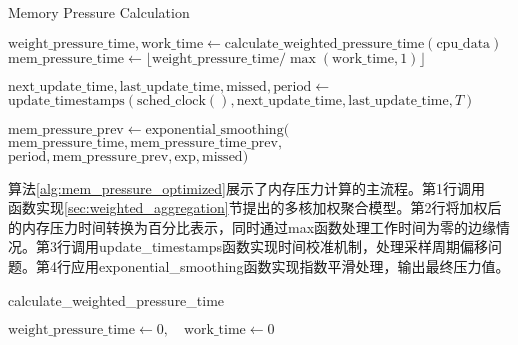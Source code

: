 \begin{algorithm}[htbp]
    \caption{Memory Pressure Calculation}
    \label{alg:mem_pressure_optimized}
    \SetAlgoLined
    \DontPrintSemicolon


    \BlankLine

    \(\text{weight\_pressure\_time}, \text{work\_time} \gets \text{calculate\_weighted\_pressure\_time}(\text{cpu\_data})\)\;
    \(\text{mem\_pressure\_time} \gets \lfloor \text{weight\_pressure\_time}/\max(\text{work\_time},1)\rfloor\)\;

    \(\text{next\_update\_time}, \text{last\_update\_time}, \text{missed}, \text{period} \gets\) \(\text{update\_timestamps}(\text{sched\_clock}(), \text{next\_update\_time}, \text{last\_update\_time}, T)\)\;

    \(\text{mem\_pressure\_prev} \gets \text{exponential\_smoothing}(\)
    \qquad \(\text{mem\_pressure\_time}, \text{mem\_pressure\_time\_prev},\)
    \qquad \(\text{period}, \text{mem\_pressure\_prev}, \text{exp}, \text{missed})\)\;
\end{algorithm}

算法\ref{alg:mem_pressure_optimized}展示了内存压力计算的主流程。第1行调用\\
函数实现\ref{sec:weighted_aggregation}节提出的多核加权聚合模型。第2行将加权后的内存压力时间转换为百分比表示，同时通过max函数处理工作时间为零的边缘情况。第3行调用update\_timestamps函数实现时间校准机制，处理采样周期偏移问题。第4行应用exponential\_smoothing函数实现指数平滑处理，输出最终压力值。

\begin{algorithm}[htbp]
\caption{calculate\_weighted\_pressure\_time}
\label{alg:calculate_weighted_pressure_time}
\SetAlgoLined
\DontPrintSemicolon
{}
\(\text{weight\_pressure\_time} \gets 0,\quad \text{work\_time} \gets 0\)\;
\end{algorithm}

